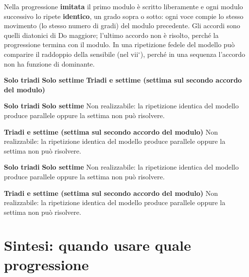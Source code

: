 Nella progressione \textbf{imitata} il primo modulo è scritto liberamente e ogni modulo successivo lo ripete \textbf{identico}, un grado sopra o sotto: ogni voce compie lo stesso movimento (lo stesso numero di gradi) del modulo precedente. Gli accordi sono quelli diatonici di Do maggiore; l'ultimo accordo non è risolto, perché la progressione termina con il modulo. In una ripetizione fedele del modello può comparire il raddoppio della sensibile (nel vii$^\circ$), perché in una sequenza l'accordo non ha funzione di dominante.

\begin{esempio}
	\label{ex:imitata_i4d}
	\textbf{Solo triadi}
	\textbf{Solo settime}
	\textbf{Triadi e settime (settima sul secondo accordo del modulo)}
\end{esempio}

\begin{esempio}
	\label{ex:imitata_i4a}
	\textbf{Solo triadi}
	\textbf{Solo settime}
	Non realizzabile: la ripetizione identica del modello produce parallele oppure la settima non può risolvere.

	\textbf{Triadi e settime (settima sul secondo accordo del modulo)}
	Non realizzabile: la ripetizione identica del modello produce parallele oppure la settima non può risolvere.

\end{esempio}

\begin{esempio}
	\label{ex:imitata_i5a}
	\textbf{Solo triadi}
	\textbf{Solo settime}
	Non realizzabile: la ripetizione identica del modello produce parallele oppure la settima non può risolvere.

	\textbf{Triadi e settime (settima sul secondo accordo del modulo)}
	Non realizzabile: la ripetizione identica del modello produce parallele oppure la settima non può risolvere.

\end{esempio}

\section{Sintesi: quando usare quale progressione}
\label{sec:sintesi_progressioni}

